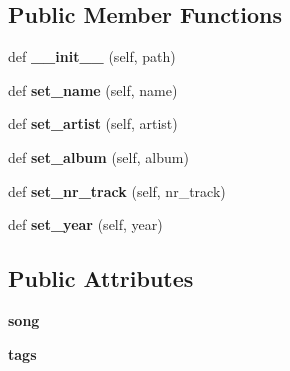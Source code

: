 \subsection*{Public Member Functions}
\begin{DoxyCompactItemize}
\item 
def {\bfseries \+\_\+\+\_\+init\+\_\+\+\_\+} (self, path)\hypertarget{classhal_1_1files_1_1models_1_1_m_p3_song_a4f37efc2f666bf142bb1ed2370244fef}{}\label{classhal_1_1files_1_1models_1_1_m_p3_song_a4f37efc2f666bf142bb1ed2370244fef}

\item 
def {\bfseries set\+\_\+name} (self, name)\hypertarget{classhal_1_1files_1_1models_1_1_m_p3_song_ae4f958b7afa7212cff8470163854a0ed}{}\label{classhal_1_1files_1_1models_1_1_m_p3_song_ae4f958b7afa7212cff8470163854a0ed}

\item 
def {\bfseries set\+\_\+artist} (self, artist)\hypertarget{classhal_1_1files_1_1models_1_1_m_p3_song_abecb2c34045dbd2133e898114198d518}{}\label{classhal_1_1files_1_1models_1_1_m_p3_song_abecb2c34045dbd2133e898114198d518}

\item 
def {\bfseries set\+\_\+album} (self, album)\hypertarget{classhal_1_1files_1_1models_1_1_m_p3_song_afda62b2b1519b7bc65e8cd98d8f2e2bf}{}\label{classhal_1_1files_1_1models_1_1_m_p3_song_afda62b2b1519b7bc65e8cd98d8f2e2bf}

\item 
def {\bfseries set\+\_\+nr\+\_\+track} (self, nr\+\_\+track)\hypertarget{classhal_1_1files_1_1models_1_1_m_p3_song_a6b456dde38763b13fb10266b7910b63f}{}\label{classhal_1_1files_1_1models_1_1_m_p3_song_a6b456dde38763b13fb10266b7910b63f}

\item 
def {\bfseries set\+\_\+year} (self, year)\hypertarget{classhal_1_1files_1_1models_1_1_m_p3_song_ac14c40460b53a47979a58864409a366c}{}\label{classhal_1_1files_1_1models_1_1_m_p3_song_ac14c40460b53a47979a58864409a366c}

\end{DoxyCompactItemize}
\subsection*{Public Attributes}
\begin{DoxyCompactItemize}
\item 
{\bfseries song}\hypertarget{classhal_1_1files_1_1models_1_1_m_p3_song_a767b9af9e2e01ce942a44cfa7cda2653}{}\label{classhal_1_1files_1_1models_1_1_m_p3_song_a767b9af9e2e01ce942a44cfa7cda2653}

\item 
{\bfseries tags}\hypertarget{classhal_1_1files_1_1models_1_1_m_p3_song_a57a2d42a3326e55f553c1a79678dd6b5}{}\label{classhal_1_1files_1_1models_1_1_m_p3_song_a57a2d42a3326e55f553c1a79678dd6b5}

\end{DoxyCompactItemize}
